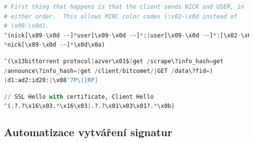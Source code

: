 
\noindent\begin{minipage}{\linewidth}
    \begin{lstlisting}[language=Python, caption={Příklad signatury pro detekci IRC. Pomocí regulárního výrazu je specifikována kostra řetězce.}]
# First thing that happens is that the client sends NICK and USER, in
# either order.  This allows MIRC color codes (\x02-\x0d instead of
# \x09-\x0d).
^(nick[\x09-\x0d -~]*user[\x09-\x0d -~]*:|user[\x09-\x0d -~]*:[\x02-\x0d -~]
*nick[\x09-\x0d -~]*\x0d\x0a)
\end{lstlisting}
\end{minipage}

\noindent\begin{minipage}{\linewidth}
    \begin{lstlisting}[language=Python, caption={Příklad signatury pro detekci BitTorrentu. Signatura je založená na klíčových slovech.}]
^(\x13bittorrent protocol|azver\x01$|get /scrape\?info_hash=get
/announce\?info_hash=|get /client/bitcomet/|GET /data\?fid=)
|d1:ad2:id20:|\x08'7P\)[RP]
\end{lstlisting}
\end{minipage}

\noindent\begin{minipage}{\linewidth}
    \begin{lstlisting}[language=Python, caption={Příklad signatury pro detekci SSL provozu. Detekce Client Hello paketu, kdy se vyměňují informace o šifrování.}]
// SSL Hello with certificate, Client Hello
^(.?.?\x16\x03.*\x16\x03|.?.?\x01\x03\x01?.*\x0b)
\end{lstlisting}
\end{minipage}

\subsection*{Automatizace vytváření signatur}

